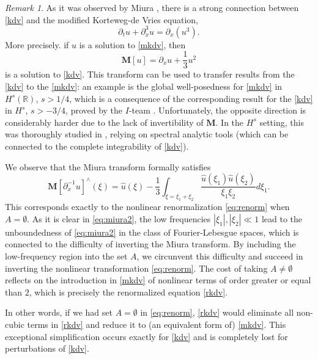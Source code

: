 \documentclass[%
11pt,  reqno]{amsart}
\newcommand{\5}{\textup{V}}
\theoremstyle{remark}
\newtheorem{remark}[theorem]{Remark}
\newcommand{\R}{\mathbb{R}}
\newcommand{\MMb}{\mathbf{M}}
\numberwithin{equation}{section}
\numberwithin{theorem}{section}
\begin{document}
	\begin{remark}
		As it was observed by Miura \cite{Miura}, there is a strong connection between \eqref{kdv} and the modified Korteweg-de Vries equation,
		\begin{equation}
			\tag{mKdV}\label{mkdv}
			\partial_t u + \partial_x^3 u = \partial_x(u^3).
		\end{equation}
		More precisely. if $u$ is a solution to \eqref{mkdv}, then
		\begin{equation}
			\MMb[u]=\partial_x u +\frac{1}{3}u^2
		\end{equation}
		is a solution to \eqref{kdv}. This transform can be used to transfer results from the \eqref{kdv} to the \eqref{mkdv}: an example is the global well-posedness for \eqref{mkdv} in $H^s(\R)$, $s>1/4$, which is a consequence of the corresponding result for the \eqref{kdv} in $H^s$, $s>-3/4$, proved by the $I$-team \cite{CKSTT_sharp_kdv}. Unfortunately, the opposite direction is considerably harder due to the lack of invertibility of $\MMb$. In the $H^s$ setting, this was thoroughly studied in  \cite{KPST_miura, BuckmasterKoch}, relying on spectral analytic tools (which can be connected to the complete integrability of \eqref{kdv}).
		
		We observe that the Miura transform formally satisfies
		\begin{equation}\label{eq:miura2}
			{\MMb[\partial_x^{-1}u]}^\wedge(\xi) = \widehat{u}(\xi)-\frac{1}{3}\int_{\xi=\xi_1+\xi_2} \frac{\widehat{u}(\xi_1)\widehat{u}(\xi_2)}{\xi_1\xi_2}d\xi_1.
		\end{equation}
		This corresponds exactly to the nonlinear renormalization \eqref{eq:renorm} when $A=\emptyset$. As it is clear in \eqref{eq:miura2}, the low frequencies $|\xi_1|, |\xi_2|\ll 1$ lead to the unboundedness of \eqref{eq:miura2} in the class of Fourier-Lebesgue spaces, which is connected to the difficulty of inverting the Miura transform.
		By including the low-frequency region into the set $A$, we circunvent this difficulty and succeed in inverting the nonlinear transformation \eqref{eq:renorm}. The cost of taking $A\neq\emptyset$ reflects on the introduction in \eqref{mkdv} of nonlinear terms of order greater or equal than $2$, which is precisely the renormalized equation \eqref{rkdv}.
		
		In other words, if we had set $A=\emptyset$ in \eqref{eq:renorm}, \eqref{rkdv} would eliminate all non-cubic terms in \eqref{rkdv} and reduce it to (an equivalent form of) \eqref{mkdv}. This exceptional simplification occurs exactly for \eqref{kdv} and is completely lost for perturbations of \eqref{kdv}.
		

\end{remark}
\end{document}
